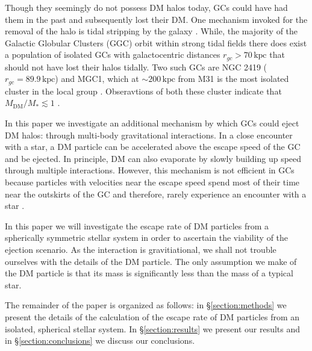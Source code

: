 \documentclass[aps,floatfix,prd,showpacs]{revtex4}
\newcommand{\MDM}{M_{\mathrm{DM}}}
\newcommand{\kpc}{\textrm{kpc}}
\begin{document}


Though they seemingly do not possess DM halos today, GCs could have had them in the past and subsequently lost their DM.  One mechanism invoked for the removal of the halo is tidal stripping by the galaxy \cite{Bromm2002,Mashchenko2005}.  While, the majority of the Galactic Globular Clusters (GGC) orbit within strong tidal fields there does exist a population of isolated GCs with galactocentric distances $r_{gc} > 70\, \kpc$ that should not have lost their halos tidally.  Two such GCs are NGC 2419 ($r_{gc} = 89.9\, \kpc$) and MGC1, which at $\sim 200\, \kpc$ from M31 is the most isolated cluster in the local group \cite {Harris, Conroy,Mackey2010}.  Obseravtions of both these cluster indicate that $\MDM/M_* \lesssim 1$ \cite{Conroy,Ibata2013}.


In this paper we investigate an additional mechanism by which GCs could eject DM halos:  through multi-body gravitational interactions.  In a close encounter with a star, a DM particle can be accelerated above the escape speed of the GC and be ejected.  In principle, DM can also evaporate by slowly building up speed through multiple interactions.  However, this mechanism is not efficient in GCs because particles with velocities near the escape speed spend most of their time near the outskirts of the GC and therefore, rarely experience an encounter with a star \cite{HenonB}.  

In this paper we will investigate the escape rate of DM particles from a spherically symmetric stellar system in order to ascertain the viability of the ejection scenario.  As the interaction is gravitiational, we shall not trouble ourselves with the details of the DM particle.  The only assumption we make of the DM particle is that its mass is significantly less than the mass of a typical star.


The remainder of the paper is organized as follows:  in \S\ref{section:methods} we present the details of the calculation of the escape rate of DM particles from an isolated, spherical stellar system.  In \S\ref{section:results} we present our results and in \S\ref{section:conclusions} we discuss our conclusions.
\end{document}
